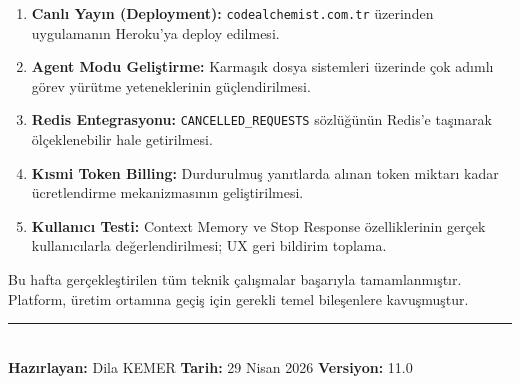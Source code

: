 \documentclass[12pt,a4paper]{article}
\begin{document}
\begin{enumerate}[leftmargin=2em, itemsep=4pt]
    \item \textbf{Canlı Yayın (Deployment):} \texttt{codealchemist.com.tr} üzerinden uygulamanın Heroku'ya deploy edilmesi.
    \item \textbf{Agent Modu Geliştirme:} Karmaşık dosya sistemleri üzerinde çok adımlı görev yürütme yeteneklerinin güçlendirilmesi.
    \item \textbf{Redis Entegrasyonu:} \texttt{CANCELLED\_REQUESTS} sözlüğünün Redis'e taşınarak ölçeklenebilir hale getirilmesi.
    \item \textbf{Kısmi Token Billing:} Durdurulmuş yanıtlarda alınan token miktarı kadar ücretlendirme mekanizmasının geliştirilmesi.
    \item \textbf{Kullanıcı Testi:} Context Memory ve Stop Response özelliklerinin gerçek kullanıcılarla değerlendirilmesi; UX geri bildirim toplama.
\end{enumerate}

\begin{successbox}
Bu hafta gerçekleştirilen tüm teknik çalışmalar başarıyla tamamlanmıştır. Platform, üretim ortamına geçiş için gerekli temel bileşenlere kavuşmuştur.
\end{successbox}

\vfill
\noindent\rule{\textwidth}{0.4pt}\\[4pt]
{\small
\textbf{Hazırlayan:} Dila KEMER \hfill
\textbf{Tarih:} 29 Nisan 2026 \hfill
\textbf{Versiyon:} 11.0
}
\end{document}
